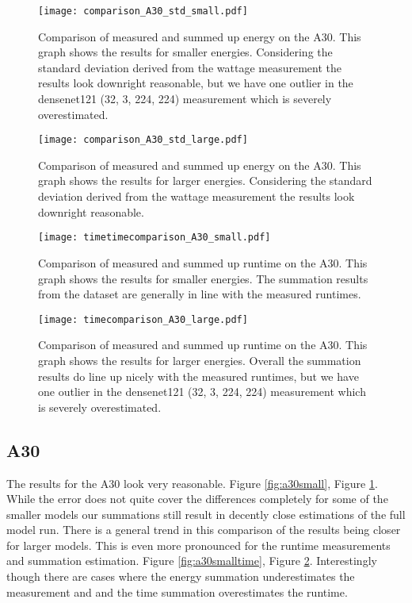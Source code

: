 \documentclass[conference]{IEEEtran}
\begin{document}
\begin{figure}
    \texttt{[image: comparison\_A30\_std\_small.pdf]}
    \caption{Comparison of measured and summed up energy on the A30. This graph shows the results for smaller energies. Considering the standard deviation derived from the wattage measurement the results look downright reasonable, but we have one outlier in the densenet121 (32, 3, 224, 224) measurement which is severely overestimated.}
    \label{fig:a30small}
    \texttt{[image: comparison\_A30\_std\_large.pdf]}
    \caption{Comparison of measured and summed up energy on the A30. This graph shows the results for larger energies. Considering the standard deviation derived from the wattage measurement the results look downright reasonable.}
    \label{fig:a30large}
\end{figure}


\begin{figure}
    \texttt{[image: timetimecomparison\_A30\_small.pdf]}
    \caption{Comparison of measured and summed up runtime on the A30. This graph shows the results for smaller energies. The summation results from the dataset are generally in line with the measured runtimes.}
    \label{fig:a30smalltime}
    \texttt{[image: timecomparison\_A30\_large.pdf]}
    \caption{Comparison of measured and summed up runtime on the A30. This graph shows the results for larger energies. Overall the summation results do line up nicely with the measured runtimes, but we have one outlier in the densenet121 (32, 3, 224, 224) measurement which is severely overestimated.}
    \label{fig:a30largetime}
\end{figure}

\subsection{A30}
The results for the A30 look very reasonable. Figure \ref{fig:a30small}, Figure \ref{fig:a30large}. While the error does not quite cover the differences completely for some of the smaller models our summations still result in decently close estimations of the full model run. There is a general trend in this comparison of the results being closer for larger models. This is even more pronounced for the runtime measurements and summation estimation. Figure \ref{fig:a30smalltime}, Figure \ref{fig:a30largetime}. Interestingly though there are cases where the energy summation underestimates the measurement and and the time summation overestimates the runtime.
\end{document}

